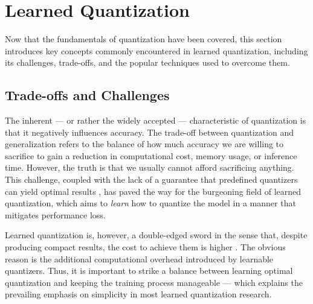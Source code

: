 \section{Learned Quantization}
\label{sec:learnedquantization}
\hspace*{1em}Now that the fundamentals of quantization have been covered, 
this section introduces key concepts commonly encountered in learned quantization,
including its challenges, trade-offs, and the popular techniques used to overcome them.



\subsection{Trade-offs and Challenges}
\label{subsec:subsection1}
\hspace*{1em}The inherent — or rather the widely accepted — characteristic of quantization is
that it negatively influences accuracy. 
The trade-off between quantization and generalization 
refers to the balance of how much accuracy we are willing to sacrifice
 to gain a reduction in computational cost, memory usage, or inference time.
However, the truth is that we usually cannot afford sacrificing anything. 
This challenge, coupled with the lack of a guarantee
 that predefined quantizers can yield optimal results \cite{DBLP:conf/eccv/ZhangYYH18, DBLP:conf/iclr/EsserMBAM20}, 
 has paved the way for the burgeoning field of learned quantization,
 which aims to \textit{learn} how to quantize the model in a manner that mitigates performance loss.

Learned quantization is, however, a double-edged sword in the sense that, despite producing compact results,
the cost to achieve them is higher \cite{DBLP:conf/eccv/ParkYV18}. The obvious reason is the additional computational overhead
introduced by learnable quantizers.
Thus, it is important to strike a balance between learning optimal quantization and keeping the training process manageable
— which explains the prevailing emphasis on simplicity in most learned quantization research.

